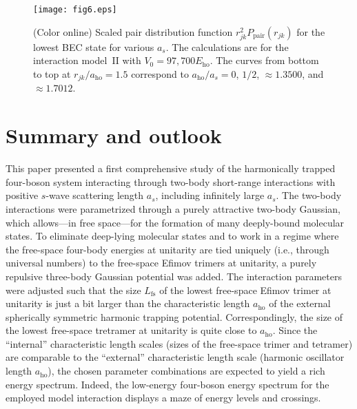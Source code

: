 \documentclass[aps,pra,twocolumn,showpacs,superscriptaddress]{revtex4}
\begin{document}
\begin{figure}[t]
\centering
\texttt{[image: fig6.eps]}
\vspace*{.5in}
\caption{(Color online)
  Scaled pair distribution function
  $r_{jk}^2 P_{\text{pair}}(r_{jk})$ for the lowest BEC state
  for various $a_s$.
  The calculations are for the interaction model~II with
$V_0=97,700E_{\text{ho}}$.
  The curves from bottom
  to top at $r_{jk}/a_{\text{ho}}=1.5$
  correspond to
  $a_{\text{ho}}/a_s=0$, $1/2$,
  $\approx 1.3500$, and $\approx 1.7012$.
}\label{fig_pair}
\end{figure}







\section{Summary and outlook}
\label{sec_conclusion}

This paper presented a first comprehensive
study of the harmonically trapped four-boson system
interacting through two-body short-range interactions with
positive $s$-wave scattering length $a_s$, including infinitely
large $a_s$.
The two-body interactions were parametrized through a
purely attractive two-body Gaussian,
which allows---in free space---for the formation
of many deeply-bound molecular states.
To eliminate deep-lying molecular states and
to work in a regime where the free-space
four-body energies at unitarity are tied
uniquely (i.e., through universal numbers)
to the free-space Efimov trimers at unitarity, a
purely repulsive three-body Gaussian potential was added.
The interaction parameters were adjusted
such that the
size $L_{\text{fs}}$ of the
lowest free-space Efimov trimer at unitarity is just a bit larger
than the characteristic length $a_{\text{ho}}$ of the external
spherically symmetric harmonic
trapping potential. Correspondingly, the size of the lowest
free-space tretramer at unitarity is quite close to $a_{\text{ho}}$.
Since the ``internal'' characteristic length scales
(sizes of the free-space trimer and tetramer)
are comparable to the ``external''
characteristic length scale
(harmonic oscillator length $a_{\text{ho}}$),
the chosen parameter
combinations are expected to yield a rich energy spectrum.
Indeed, the low-energy four-boson energy spectrum
for the employed model interaction displays a
maze of energy levels and crossings.
\end{document}
